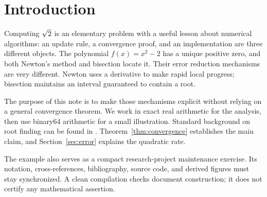 \section{Introduction}\label{sec:introduction}
Computing $\sqrt{2}$ is an elementary problem with a useful lesson about numerical
algorithms: an update rule, a convergence proof, and an implementation are three
different objects. The polynomial $f(x)=x^2-2$ has a unique positive zero, and
both Newton's method and bisection locate it. Their error reduction mechanisms
are very different. Newton uses a derivative to make rapid local progress;
bisection maintains an interval guaranteed to contain a root.

The purpose of this note is to make those mechanisms explicit without relying
on a general convergence theorem. We work in exact real arithmetic for the
analysis, then use binary64 arithmetic for a small illustration. Standard
background on root finding can be found in \cite{burden2015,stoer2002}.
Theorem~\ref{thm:convergence} establishes the main claim, and
Section~\ref{sec:error} explains the quadratic rate.

The example also serves as a compact research-project maintenance exercise.
Its notation, cross-references, bibliography, source code, and derived figures
must stay synchronized. A clean compilation checks document construction;
it does not certify any mathematical assertion.
